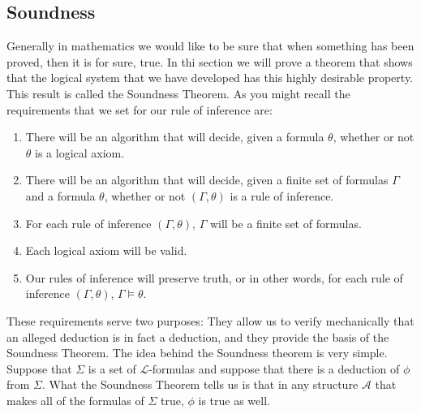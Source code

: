 \documentclass[10pt,a4paper]{article}
\newcounter{theo}
\newcommand{\curveL}{\mathcal{L}}
\newcommand{\curveA}{\mathcal{A}}
\begin{document}
                    \subsection{Soundness}
                        Generally in mathematics we would like to be sure that when something has been proved, then it is for sure, true. In thi section we will prove a theorem that shows that the logical system that we have developed has this highly desirable property. This result is called the Soundness Theorem. As you might recall the requirements that we set for our rule of inference are:
                        \begin{enumerate}
                            \item There will be an algorithm that will decide, given a formula $\theta$, whether or not $\theta$ is a logical axiom.
                            \item There will be an algorithm that will decide, given a finite set of formulas $\Gamma$ and a formula $\theta$, whether or not $(\Gamma, \theta)$ is a rule of inference.
                            \item For each rule of inference $(\Gamma,\theta)$, $\Gamma$ will be a finite set of formulas.
                            \item Each logical axiom will be valid.
                            \item Our rules of inference will preserve truth, or in other words, for each rule of inference $(\Gamma,\theta)$, $\Gamma\vDash \theta$.
                        \end{enumerate}
                        These requirements serve two purposes: They allow us to verify mechanically that an alleged deduction is in fact a deduction, and they provide the basis of the Soundness Theorem. The idea behind the Soundness theorem is very simple. Suppose that $\Sigma$ is a set of $\curveL$-formulas and suppose that there is a deduction of $\phi$ from $\Sigma$. What the Soundness Theorem tells us is that in any structure $\curveA$ that makes all of the formulas of $\Sigma$ true, $\phi$ is true as well.
\end{document}
